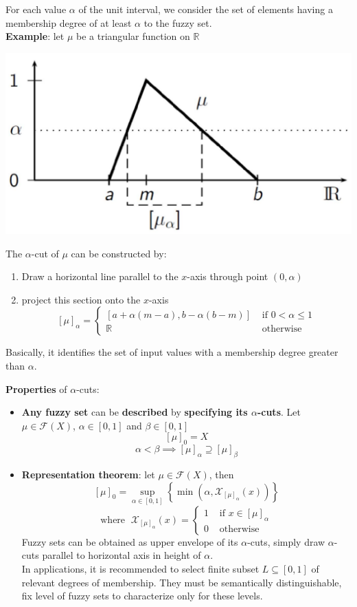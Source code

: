 For each value $\alpha$ of the unit interval, we consider the set of elements having a membership degree of at least $\alpha$ to the fuzzy set.\\

\textbf{Example}: let $\mu$ be a triangular function on $\mathbb{R}$
\begin{center}
	\includegraphics[width=0.45\columnwidth]{img/FS/hr1}
\end{center}
The $\alpha$-cut of $\mu$ can be constructed by: 
\begin{enumerate}
	\item Draw a horizontal line parallel to the $x$-axis through point $(0, \alpha)$
	\item project this section onto the $x$-axis
	$$ [\mu]_\alpha = \begin{cases}
		[a + \alpha(m-a), b - \alpha (b-m)] & \text{ if } 0 < \alpha \leq 1 \\
		\mathbb{R} & \text{ otherwise }
	\end{cases}$$
\end{enumerate}
Basically, it identifies the set of input values with a membership degree greater than $\alpha$.\\

\newpage

\textbf{Properties} of $\alpha$-cuts: 
\begin{itemize}
	\item \textbf{Any fuzzy set} can be \textbf{described} by \textbf{specifying its $\alpha$-cuts}. Let $\mu \in \mathcal{F} (X)$, $\alpha \in [0,1]$ and $\beta \in [0,1]$
	$$ [\mu]_0 = X$$
	$$ \alpha < \beta \implies [\mu]_\alpha \supseteq [\mu]_\beta $$
	\nn
	
	\item \textbf{Representation theorem}: let $\mu \in \mathcal{F} (X)$, then 
	$$ [\mu]_0 = \sup_{\alpha \in [0,1]} \left\{\min\left(\alpha, \mathcal{X}_{[\mu]_\alpha} (x)\right) \right\} $$
	$$ \text{where }\; \mathcal{X}_{[\mu]_\alpha} (x) = \begin{cases}
		1 & \text{ if } x \in [\mu]_\alpha \\
		0 & \text{ otherwise }
	\end{cases}$$
	Fuzzy sets can be obtained as upper envelope of its $\alpha$-cuts, simply draw $\alpha$-cuts parallel to horizontal axis in height of $\alpha$.\\
	In applications, it is recommended to select finite subset $L \subseteq [0,1]$ of relevant degrees of membership. They must be semantically distinguishable, fix level of fuzzy sets to characterize only for these levels.\\
\end{itemize}

